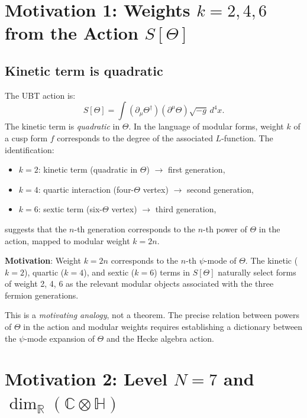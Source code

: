 \documentclass[12pt]{article}
\theoremstyle{definition}
\theoremstyle{remark}
\begin{document}
\section{Motivation 1: Weights $k = 2, 4, 6$ from the Action $S[\Theta]$}
\label{sec:weights}

\subsection{Kinetic term is quadratic}

The UBT action is:
\begin{equation}
  S[\Theta] = \int (\partial_\mu\Theta^\dagger)(\partial^\mu\Theta)\sqrt{-g}\,d^4x.
\end{equation}
The kinetic term is \emph{quadratic} in $\Theta$.  In the language of modular forms,
weight $k$ of a cusp form $f$ corresponds to the degree of the associated $L$-function.
The identification:
\begin{itemize}
  \item $k = 2$: kinetic term (quadratic in $\Theta$) $\to$ first generation,
  \item $k = 4$: quartic interaction (four-$\Theta$ vertex) $\to$ second generation,
  \item $k = 6$: sextic term (six-$\Theta$ vertex) $\to$ third generation,
\end{itemize}
suggests that the $n$-th generation corresponds to the $n$-th power of $\Theta$ in the
action, mapped to modular weight $k = 2n$.

\begin{motivatebox}
\textbf{Motivation}: Weight $k = 2n$ corresponds to the $n$-th $\psi$-mode of $\Theta$.
The kinetic ($k=2$), quartic ($k=4$), and sextic ($k=6$) terms in $S[\Theta]$ naturally
select forms of weight 2, 4, 6 as the relevant modular objects associated with the
three fermion generations.
\end{motivatebox}

This is a \emph{motivating analogy}, not a theorem.  The precise relation between
powers of $\Theta$ in the action and modular weights requires establishing a
dictionary between the $\psi$-mode expansion of $\Theta$ and the Hecke algebra action.

\section{Motivation 2: Level $N = 7$ and $\dim_{\mathbb{R}}(\mathbb{C}\otimes\mathbb{H})$}
\label{sec:level}
\end{document}
